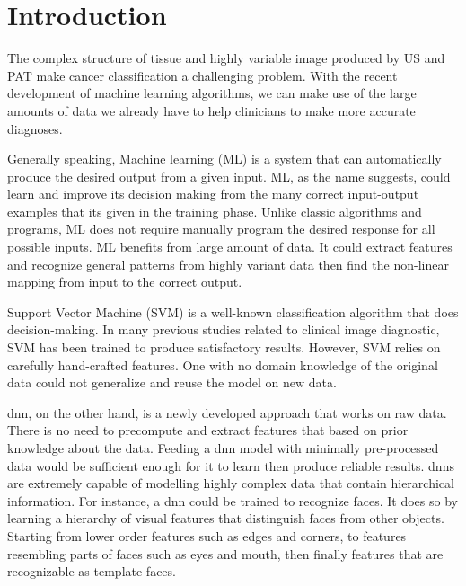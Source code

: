 \chapter{Introduction} %




The complex structure of tissue and highly variable image produced by US and PAT make cancer classification a challenging problem. With the recent development of machine learning algorithms, we can make use of the large amounts of data we already have to help clinicians to make more accurate diagnoses. 

Generally speaking, Machine learning (ML) is a system that can automatically produce the desired output from a given input. ML, as the name suggests, could learn and improve its decision making from the many correct input-output examples that its given in the training phase. Unlike classic algorithms and programs, ML does not require manually program the desired response for all possible inputs. ML benefits from large amount of data. It could extract features and recognize general patterns from highly variant data then find the non-linear mapping from input to the correct output. 

Support Vector Machine (SVM) is a well-known classification algorithm that does decision-making. In many previous studies related to clinical image diagnostic, SVM has been trained to produce satisfactory results. However, SVM relies on carefully hand-crafted features. One with no domain knowledge of the original data could not generalize and reuse the model on new data.

\ac{dnn}, on the other hand, is a newly developed approach that works on raw data. There is no need to precompute and extract features that based on prior knowledge about the data. Feeding a \ac{dnn} model with minimally pre-processed data would be sufficient enough for it to learn then produce reliable results. \acp{dnn} are extremely capable of modelling highly complex data that contain hierarchical information. For instance, a \ac{dnn} could be trained to recognize faces. It does so by learning a hierarchy of visual features that distinguish faces from other objects. Starting from lower order features such as edges and corners, to features resembling parts of faces such as eyes and mouth, then finally features that are recognizable as template faces.

